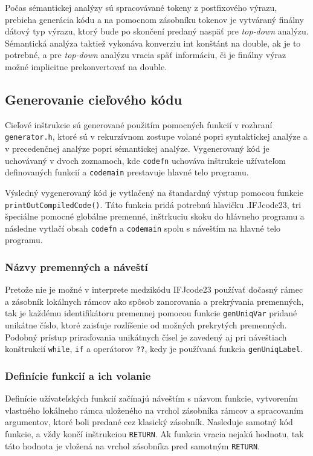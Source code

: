 \documentclass[a4paper,11pt]{article}
\begin{document}
Počas sémantickej analýzy sú spracovávané tokeny z postfixového výrazu, prebieha generácia kódu a na pomocnom zásobníku tokenov je vytváraný finálny dátový typ výrazu, ktorý bude po skončení predaný naspäť pre \textit{top-down} analýzu. Sémantická analýza taktiež vykonáva konverziu int konštánt na double, ak je to potrebné, a pre \textit{top-down} analýzu vracia späť informáciu, či je finálny výraz možné implicitne prekonvertovať na double.

\subsection{Generovanie cieľového kódu}
Cieľové inštrukcie sú generované použitím pomocných funkcií v rozhraní \texttt{generator.h}, ktoré sú v rekurzívnom zostupe volané popri syntaktickej analýze a v precedenčnej analýze popri sémantickej analýze. Vygenerovaný kód je uchovávaný v dvoch zoznamoch, kde \texttt{code\textunderscore fn} uchováva inštrukcie užívateľom definovaných funkcií a \texttt{code\textunderscore main} prestavuje hlavné telo programu. 

Výsledný vygenerovaný kód je vytlačený na štandardný výstup pomocou funkcie \texttt{printOutCompiledCode()}. Táto funkcia pridá potrebnú hlavičku .IFJcode23, tri špeciálne pomocné globálne premenné, inštrkuciu skoku do hlávneho programu a následne vytlačí obsah \texttt{code\textunderscore fn} a \texttt{code\textunderscore main} spolu s náveštím na hlavné telo programu.

\subsubsection{Názvy premenných a náveští}
Pretože nie je možné v interprete medzikódu IFJcode23 používať dočasný rámec a zásobník lokálnych rámcov ako spôsob zanorovania a prekrývania premenných, tak je každému identifikátoru premennej pomocou funkcie \texttt{genUniqVar} pridané unikátne číslo, ktoré zaisťuje rozlíšenie od možných prekrytých premenných. Podobný prístup priraďovania unikátnych čísel je zavedený aj pri náveštiach konštrukcií \texttt{while}, \texttt{if} a operátorov \texttt{??}, kedy je používaná funkcia \texttt{genUniqLabel}.

\subsubsection{Definície funkcií a ich volanie}
Definície užívateľských funkcií začínajú náveštím s názvom funkcie, vytvorením vlastného lokálneho rámca uloženého na vrchol zásobníka rámcov a spracovaním argumentov, ktoré boli predané cez klasický zásobník. Nasleduje samotný kód funkcie, a vždy končí inštrukciou \texttt{RETURN}. Ak funkcia vracia nejakú hodnotu, tak táto hodnota je vložená na vrchol zásobníka pred samotným \texttt{RETURN}.
\end{document}
